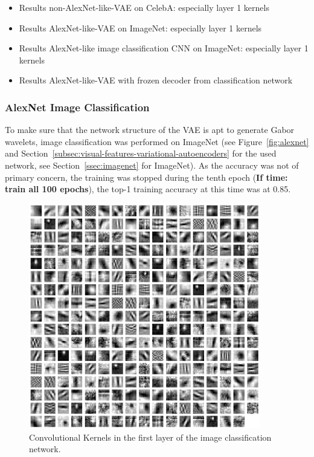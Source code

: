 \documentclass[11pt]{article}
\begin{document}
    \begin{itemize}
        \item Results non-AlexNet-like-VAE on CelebA: especially layer 1 kernels
        \item Results AlexNet-like-VAE on ImageNet: especially layer 1 kernels
        \item Results AlexNet-like image classification CNN on ImageNet: especially layer 1 kernels
        \item Results AlexNet-like-VAE with frozen decoder from classification network
    \end{itemize}

    \subsubsection{AlexNet Image Classification}
    To make sure that the network structure of the \ac{VAE} is apt to generate Gabor wavelets, image classification was performed on ImageNet (see Figure~\ref{fig:alexnet} and Section~\ref{subsec:visual-features-variational-autoencoders} for the used network, see Section~\ref{ssec:imagenet} for ImageNet).
    As the accuracy was not of primary concern, the training was stopped during the tenth epoch (\textbf{If time: train all 100 epochs}), the top-1 training accuracy at this time was at 0.85.

    \begin{figure}
        \centering
        \includegraphics[width=0.9\textwidth]{images/alexnet_classification_l1_kernels.png}
        \caption[Image classification - Layer 1 Kernels]{Convolutional Kernels in the first layer of the image classification network.}
        \label{fig:classification_layer1_kernels}
    \end{figure}
\end{document}
